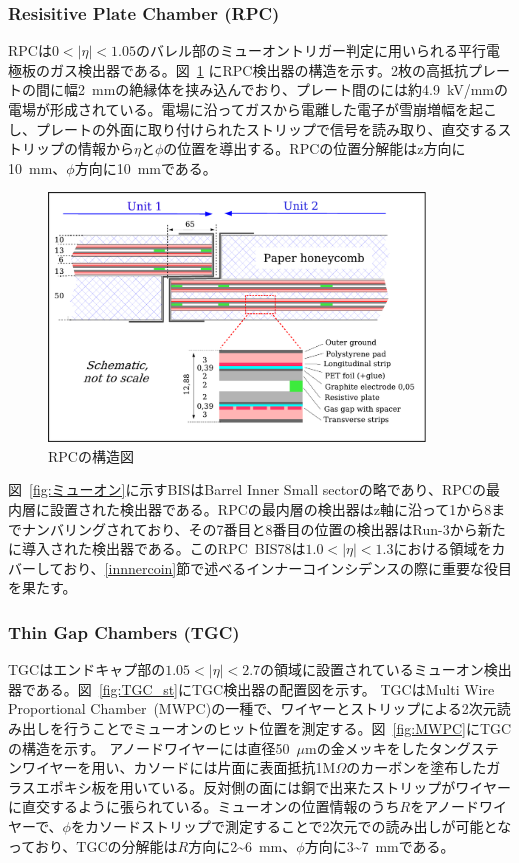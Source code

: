 \subsubsection{Resisitive Plate Chamber (RPC)}
RPCは$0 < |\eta| < 1.05$のバレル部のミューオントリガー判定に用いられる平行電極板のガス検出器である。図~\ref{fig:RPC} にRPC検出器の構造を示す。2枚の高抵抗プレートの間に幅2~mmの絶縁体を挟み込んでおり、プレート間のには約4.9~kV/mmの電場が形成されている。電場に沿ってガスから電離した電子が雪崩増幅を起こし、プレートの外面に取り付けられたストリップで信号を読み取り、直交するストリップの情報から$\eta$と$\phi$の位置を導出する。RPCの位置分解能はz方向に10~mm、$\phi$方向に10~mmである。

\begin{figure}[tb]
  \centering
  \includegraphics[clip, width=10cm]{fig/2/RPC_structure.pdf}
  \caption{RPCの構造図\cite{Aad:1129811}}
  \label{fig:RPC}
\end{figure}

図~\ref{fig:ミューオン}に示すBISはBarrel Inner Small sectorの略であり、RPCの最内層に設置された検出器である。RPCの最内層の検出器はz軸に沿って1から8までナンバリングされており、その7番目と8番目の位置の検出器はRun-3から新たに導入された検出器である。このRPC~BIS78は$1.0 < |\eta| < 1.3$における領域をカバーしており、\ref{innnercoin}節で述べるインナーコインシデンスの際に重要な役目を果たす。

\subsubsection{Thin Gap Chambers (TGC)}
TGCはエンドキャプ部の$1.05 < |\eta| < 2.7$の領域に設置されているミューオン検出器である。図~\ref{fig:TGC_st}にTGC検出器の配置図を示す。
TGCはMulti Wire Proportional Chamber~(MWPC)の一種で、ワイヤーとストリップによる2次元読み出しを行うことでミューオンのヒット位置を測定する。図~\ref{fig:MWPC}にTGCの構造を示す。
アノードワイヤーには直径50~$\mu$mの金メッキをしたタングステンワイヤーを用い、カソードには片面に表面抵抗1M$\Omega$のカーボンを塗布したガラスエポキシ板を用いている。反対側の面には銅で出来たストリップがワイヤーに直交するように張られている。ミューオンの位置情報のうち$R$をアノードワイヤーで、$\phi$をカソードストリップで測定することで2次元での読み出しが可能となっており、TGCの分解能は$R$方向に2\textasciitilde6~mm、$\phi$方向に3\textasciitilde7~mmである。

